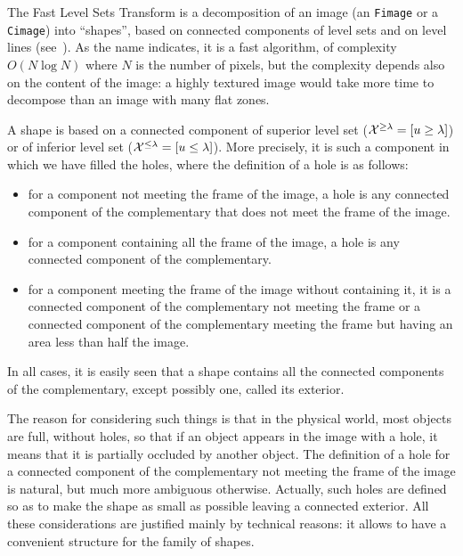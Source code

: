 The Fast Level Sets Transform  
 is a decomposition of an image
(an \texttt{Fimage} or a \texttt{Cimage}) into ``shapes'', based on connected
components of level sets and on level lines 
(see~\cite{monasse.guichard:fast}\cite{monasse.guichard:scale-space}\cite{ballester.caselles.ea:tree}). 
As the name indicates, it is a fast algorithm, of complexity $O(N\log N)$
where $N$ is the number of pixels, but the complexity depends
also on the content of the image: a highly textured image would
take more time to decompose than an image with many flat zones.

A shape is based on a connected component of superior level set
(${\cal X}^{\geq \lambda} = [u\geq \lambda]$) or of inferior
level set (${\cal X}^{\leq \lambda} = [u \leq \lambda]$). More
precisely, it is such a component in which we have filled the
holes, where the definition of a hole is as follows:
\begin{itemize}
\item for a component not meeting the frame of the image, a hole
is any connected component of the complementary that does not meet
the frame of the image.
\item for a component containing all the frame of the image, a
hole is any connected component of the complementary.
\item for a component meeting the frame of the image without
containing it, it is a connected component of the
complementary not meeting the frame or a connected component of
the complementary meeting the frame but having an area less than
half the image.
\end{itemize}
In all cases, it is easily seen that a shape contains all the
connected components of the complementary, except possibly one,
called its exterior.

The reason for considering such things is that in the physical world,
most objects are full, without holes, so that if an object appears in
the image with a hole, it means that it is partially occluded by another
object. The definition of a hole for a connected component of the
complementary not meeting the frame of the image is natural, but much
more ambiguous otherwise. Actually, such holes are defined so as to make
the shape as small as possible leaving a connected exterior. All these
considerations are justified mainly by technical reasons: it allows to have
a convenient structure for the family of shapes.


